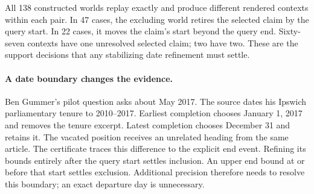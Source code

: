 All 138 constructed worlds replay exactly and produce different rendered contexts within each pair.
In 47 cases, the excluding world retires the selected claim by the query start.
In 22 cases, it moves the claim's start beyond the query end.
Sixty-seven contexts have one unresolved selected claim; two have two.
These are the support decisions that any stabilizing date refinement must settle.

\paragraph{A date boundary changes the evidence.}
Ben Gummer's pilot question asks about May 2017.
The source dates his Ipswich parliamentary tenure to 2010--2017.
Earliest completion chooses January 1, 2017 and removes the tenure excerpt.
Latest completion chooses December 31 and retains it.
The vacated position receives an unrelated heading from the same article.
The certificate traces this difference to the explicit end event.
Refining its bounds entirely after the query start settles inclusion.
An upper end bound at or before that start settles exclusion.
Additional precision therefore needs to resolve this boundary; an exact departure day is unnecessary.
